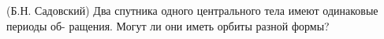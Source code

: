 (Б.Н. Садовский)
Два спутника одного центрального тела имеют одинаковые периоды об-
ращения. Могут ли они иметь орбиты разной формы?

